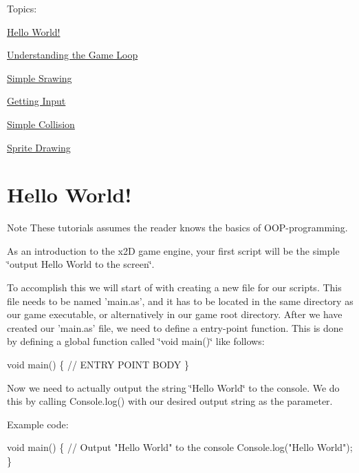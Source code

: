 Topics\+:
\begin{DoxyItemize}
\item \hyperlink{hello_world}{Hello World!}
\item \hyperlink{gameloop}{Understanding the Game Loop}
\item \hyperlink{drawing}{Simple Srawing}
\item \hyperlink{input}{Getting Input}
\item \hyperlink{collision}{Simple Collision}
\item \hyperlink{sprites}{Sprite Drawing} 
\end{DoxyItemize}\hypertarget{hello_world}{}\section{Hello World!}\label{hello_world}
\begin{DoxyNote}{Note}
These tutorials assumes the reader knows the basics of O\+O\+P-\/programming.
\end{DoxyNote}
As an introduction to the x2\+D game engine, your first script will be the simple \char`\"{}output Hello World to the screen\char`\"{}.

To accomplish this we will start of with creating a new file for our scripts. This file needs to be named 'main.\+as', and it has to be located in the same directory as our game executable, or alternatively in our game root directory. After we have created our 'main.\+as' file, we need to define a entry-\/point function. This is done by defining a global function called \char`\"{}void main()\char`\"{} like follows\+:


\begin{DoxyCode}
\textcolor{keywordtype}{void} main()
\{
        \textcolor{comment}{// ENTRY POINT BODY}
\}
\end{DoxyCode}


Now we need to actually output the string \char`\"{}\+Hello World\char`\"{} to the console. We do this by calling Console.\+log() with our desired output string as the parameter.

Example code\+:


\begin{DoxyCode}
\textcolor{keywordtype}{void} main()
\{
        \textcolor{comment}{// Output "Hello World" to the console}
        Console.log(\textcolor{stringliteral}{"Hello World"});
\}
\end{DoxyCode}


